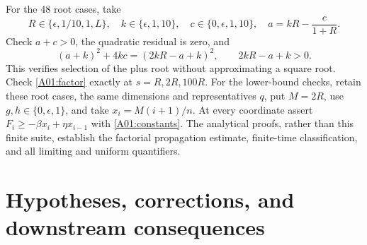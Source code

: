 \documentclass[11pt]{article}
\begin{document}
For the 48 root cases, take
\[
 R\in\{\epsilon,1/10,1,L\},\quad
 k\in\{\epsilon,1,10\},\quad
 c\in\{0,\epsilon,1,10\},\quad
 a=kR-\frac{c}{1+R}.
\]
Check $a+c>0$, the quadratic residual is zero, and
\[
 (a+k)^2+4kc=(2kR-a+k)^2,\qquad 2kR-a+k>0.
\]
This verifies selection of the plus root without approximating a square
root. Check \eqref{A01:factor} exactly at $s=R,2R,100R$.
For the lower-bound checks, retain these root cases, the same dimensions
and representatives $q$, put $M=2R$, use $g,h\in\{0,\epsilon,1\}$,
and take $x_i=M(i+1)/n$. At every coordinate assert
$F_i\geq-\beta x_i+\eta x_{i-1}$ with \eqref{A01:constants}.
The analytical proofs, rather than this finite suite, establish the
factorial propagation estimate, finite-time classification, and all
limiting and uniform quantifiers.

\section{Hypotheses, corrections, and downstream consequences}
\end{document}
